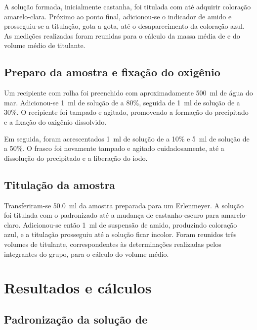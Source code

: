 \documentclass[a4paper,12pt]{article}
\begin{document}
A solução formada, inicialmente castanha, foi titulada com 
até adquirir coloração amarelo-clara. Próximo ao ponto final, adicionou-se o
indicador de amido e prosseguiu-se a titulação, gota a gota, até o
desaparecimento da coloração azul. As medições realizadas foram reunidas para
o cálculo da massa média de  e do volume médio de titulante.

\subsection{Preparo da amostra e fixação do oxigênio}

Um recipiente com rolha foi preenchido com aproximadamente
\qty{500}{\milli\litre} de água do mar. Adicionou-se
\qty{1}{\milli\litre} de solução de  a 80\%, seguida de
\qty{1}{\milli\litre} de solução de  a 30\%. O recipiente foi
tampado e agitado, promovendo a formação do precipitado e a fixação do
oxigênio dissolvido.

Em seguida, foram acrescentados \qty{1}{\milli\litre} de solução de
 a 10\% e \qty{5}{\milli\litre} de solução de  a 50\%.
O frasco foi novamente tampado e agitado cuidadosamente, até a dissolução do
precipitado e a liberação do iodo.

\subsection{Titulação da amostra}

Transferiram-se \qty{50.0}{\milli\litre} da amostra preparada para um
Erlenmeyer. A solução foi titulada com o  padronizado até a
mudança de castanho-escuro para amarelo-claro. Adicionou-se então
\qty{1}{\milli\litre} de suspensão de amido, produzindo coloração azul, e
a titulação prosseguiu até a solução ficar incolor. Foram reunidos três
volumes de titulante, correspondentes às determinações realizadas pelos
integrantes do grupo, para o cálculo do volume médio.

\section{Resultados e cálculos}

\subsection{Padronização da solução de }
\end{document}
